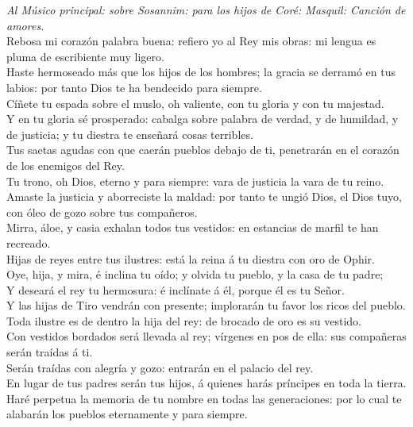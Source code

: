  \emph{Al Músico principal: sobre Sosannim: para los hijos
de Coré: Masquil: Canción de amores.}\\
Rebosa mi corazón palabra buena: refiero yo al Rey mis obras: mi lengua
es pluma de escribiente muy ligero.\\
 Haste hermoseado más que los hijos de los hombres; la
gracia se derramó en tus labios: por tanto Dios te ha bendecido para
siempre.\\
 Cíñete tu espada sobre el muslo, oh valiente, con tu gloria
y con tu majestad.\\
 Y en tu gloria sé prosperado: cabalga sobre palabra de
verdad, y de humildad, y de justicia; y tu diestra te enseñará cosas
terribles.\\
 Tus saetas agudas con que caerán pueblos debajo de ti,
penetrarán en el corazón de los enemigos del Rey.\\
 Tu trono, oh Dios, eterno y para siempre: vara de justicia
la vara de tu reino.\\
 Amaste la justicia y aborreciste la maldad: por tanto te
ungió Dios, el Dios tuyo, con óleo de gozo sobre tus compañeros.\\
 Mirra, áloe, y casia exhalan todos tus vestidos: en
estancias de marfil te han recreado.\\
 Hijas de reyes entre tus ilustres: está la reina á tu
diestra con oro de Ophir.\\
 Oye, hija, y mira, é inclina tu oído; y olvida tu pueblo,
y la casa de tu padre;\\
 Y deseará el rey tu hermosura: é inclínate á él, porque él
es tu Señor.\\
 Y las hijas de Tiro vendrán con presente; implorarán tu
favor los ricos del pueblo.\\
 Toda ilustre es de dentro la hija del rey: de brocado de
oro es su vestido.\\
 Con vestidos bordados será llevada al rey; vírgenes en pos
de ella: sus compañeras serán traídas á ti.\\
 Serán traídas con alegría y gozo: entrarán en el palacio
del rey.\\
 En lugar de tus padres serán tus hijos, á quienes harás
príncipes en toda la tierra.\\
 Haré perpetua la memoria de tu nombre en todas las
generaciones: por lo cual te alabarán los pueblos eternamente y para
siempre.

